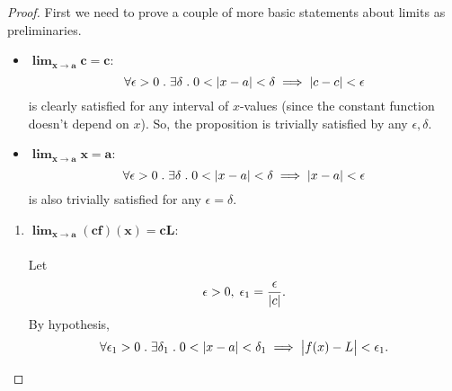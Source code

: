 \documentclass[../MathsNotesBase.tex]{subfiles}
\begin{document}
{	
		\bigskip
		\begin{proof}
			First we need to prove a couple of more basic statements about limits as preliminaries.
			\begin{itemize}
				\item{${\bm{ \lim_{x \to a} c = c }}$:\\
					\[ \forall \epsilon > 0 \;.\; \exists \delta \;.\; 0 < \left\lvert x - a\right\rvert < \delta \implies \left\lvert c - c\right\rvert < \epsilon \]
					is clearly satisfied for any interval of $x$-values (since the constant function doesn't depend on $x$). So, the proposition is trivially satisfied by any ${ \epsilon,\delta }$.
				}
				\item{${\bm{ \lim_{x \to a} x = a }}$:\\
					\[ \forall \epsilon > 0 \;.\; \exists \delta \;.\; 0 < \left\lvert x - a\right\rvert < \delta \implies \left\lvert x - a\right\rvert < \epsilon \]
					is also trivially satisfied for any ${ \epsilon = \delta }$.
				}
			\end{itemize}
			\bigskip
			\begin{enumerate}[label=(\roman*)]
				\item{${\bm{ \lim_{x \to a} (cf)(x) = cL }}$:\\\\
					Let 
					\[ \epsilon > 0,\; \epsilon_1 = \frac{\epsilon}{\left\lvert c\right\rvert}.\]
					By hypothesis,
					\[ \forall \epsilon_1 > 0 \;.\; \exists \delta_1 \;.\; 0 < \left\lvert x - a\right\rvert < \delta_1 \implies \left\lvert f(x) - L\right\rvert < \epsilon_1. \]
}
\end{enumerate}
\end{proof}}
\end{document}
